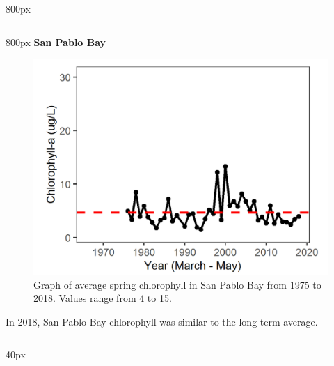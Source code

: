 \documentclass[
]{book}
\begin{document}
\begin{column}{800px\textwidth}
\end{column}

\begin{column}{800px\textwidth}
\textbf{San Pablo Bay}

\begin{figure}
\includegraphics[width=15.25in]{figures/chla_splspring} \caption{Graph of average spring chlorophyll in San Pablo Bay from 1975 to 2018. Values range from 4 to 15.}\label{fig:unnamed-chunk-20}
\end{figure}

In 2018, San Pablo Bay chlorophyll was similar to the long-term average.
\end{column}

\begin{column}{40px\textwidth}
~
\end{column}
\end{document}
